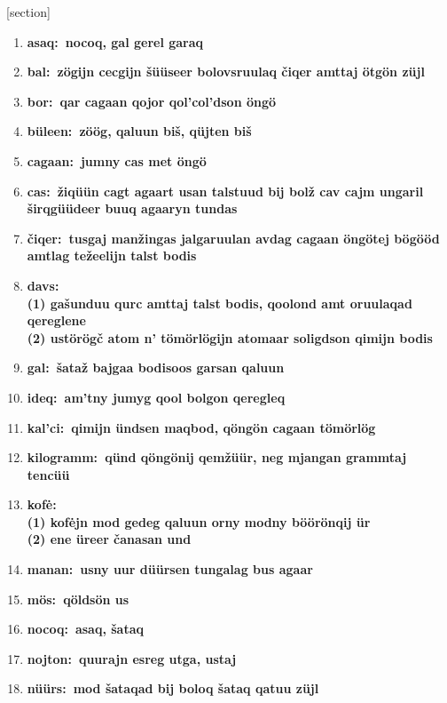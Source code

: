 \renewcommand{\theenumii}{\arabic{enumii}}


[section]
\newcommand \mongtxt [2]{\bgroup\bfseries{#1:}\egroup\ #2}

\begin{enumerate}
\setlength{\itemsep}{0pt}
\setlength{\parsep}{0pt}
\setlength{\parskip}{5pt}

\item \mongtxt{asaq}{nocoq, gal gerel garaq}
\item \mongtxt{bal}{zögijn cecgijn šüüseer bolovsruulaq čiqer amttaj ötgön züjl}
\item \mongtxt{bor}{qar cagaan qojor qol’col’dson öngö}
\item \mongtxt{büleen}{zöög, qaluun biš, qüjten biš}
\item \mongtxt{cagaan}{jumny cas met öngö}
\item \mongtxt{cas}{žiqüün cagt agaart usan talstuud bij bolž cav cajm ungaril širqgüüdeer buuq agaaryn tundas}
\item \mongtxt{čiqer}{tusgaj manžingas jalgaruulan avdag cagaan öngötej bögööd amtlag težeelijn talst bodis}
\item \mongtxt{davs}{\medskip\\(1) gašunduu qurc amttaj talst bodis, qoolond amt oruulaqad qereglene \\(2) ustörögč atom n’ tömörlögijn atomaar soligdson qimijn bodis}
\item \mongtxt{gal}{šataž bajgaa bodisoos garsan qaluun}
\item \mongtxt{ideq}{am’tny jumyg qool bolgon qeregleq}
\item \mongtxt{kal’ci}{qimijn ündsen maqbod, qöngön cagaan tömörlög}
\item \mongtxt{kilogramm}{qünd qöngönij qemžüür, neg mjangan grammtaj tencüü}
\item \mongtxt{kofė}{\medskip\\(1) kofėjn mod gedeg qaluun orny modny böörönqij ür \\(2) ene üreer čanasan und}
\item \mongtxt{manan}{usny uur düürsen tungalag bus agaar}
\item \mongtxt{mös}{qöldsön us}
\item \mongtxt{nocoq}{asaq, šataq}
\item \mongtxt{nojton}{quurajn esreg utga, ustaj}
\item \mongtxt{nüürs}{mod šataqad bij boloq šataq qatuu züjl}

\end{enumerate}
